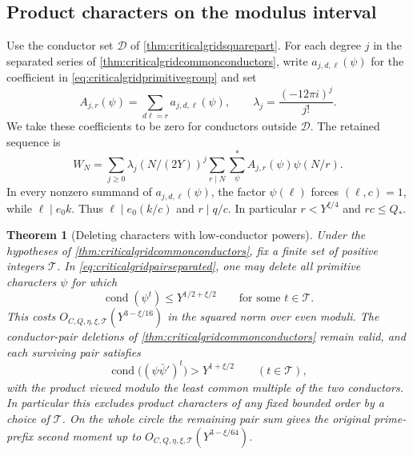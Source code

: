 \documentclass[11pt,a4paper]{article}
\numberwithin{equation}{section}
\newtheorem{theorem}{Theorem}[section]
\begin{document}
\clearpage
\subsection{Product characters on the modulus interval}

Use the conductor set $\mathcal D$ of
\cref{thm:criticalgridsquarepart}. For each degree $j$ in
the separated series of \cref{thm:criticalgridcommonconductors},
write $a_{j,d,\ell}(\psi)$ for the coefficient in
\cref{eq:criticalgridprimitivegroup} and set
\[
 A_{j,r}(\psi)=\sum_{d\ell=r}a_{j,d,\ell}(\psi),\qquad
 \lambda_j=\frac{(-12\pi i)^j}{j!}.
\]
We take these coefficients to be zero for conductors outside
$\mathcal D$. The retained sequence is
\begin{equation}
 W_N=\sum_{j\ge0}\lambda_j(N/(2Y))^j
              \sum_{r\mid N}\sum_\psi^* A_{j,r}(\psi)\psi(N/r).
 \label{eq:criticalgridpairseparated}
\end{equation}
In every nonzero summand of $a_{j,d,\ell}(\psi)$,
the factor $\psi(\ell)$ forces $(\ell,c)=1$, while $\ell\mid e_0 k$.
Thus $\ell\mid e_0(k/c)$ and $r\mid q/c$. In particular
$r<Y^{\xi/4}$ and $rc\le Q_*$.

\begin{theorem}[Deleting characters with low-conductor powers]
\label{thm:criticalgridproductpowers}
Under the hypotheses of \cref{thm:criticalgridcommonconductors},
fix a finite set of positive integers $\mathcal T$. In
\cref{eq:criticalgridpairseparated}, one may delete all
primitive characters $\psi$ for which
\begin{equation}
 \operatorname{cond}(\psi^t)\le Y^{1/2+\xi/2}
                 \qquad\text{for some }t\in\mathcal T .
 \label{eq:criticalgridproductpowercut}
\end{equation}
This costs $O_{C,Q,\eta,\xi,\mathcal T}(Y^{3-\xi/16})$
in the squared norm over even moduli. The conductor-pair
deletions of \cref{thm:criticalgridcommonconductors} remain
valid, and each surviving pair satisfies
\begin{equation}
 \operatorname{cond}\big((\psi\bar\psi')^t\big)
                    > Y^{1+\xi/2}\qquad(t\in\mathcal T),
 \label{eq:criticalgridproductpowerlower}
\end{equation}
with the product viewed modulo the least common multiple of
the two conductors. In particular this excludes product
characters of any fixed bounded order by a choice of
$\mathcal T$. On the whole circle the remaining pair sum
gives the original prime-prefix second moment up to
$O_{C,Q,\eta,\xi,\mathcal T}(Y^{3-\xi/64})$.
\end{theorem}
\end{document}

